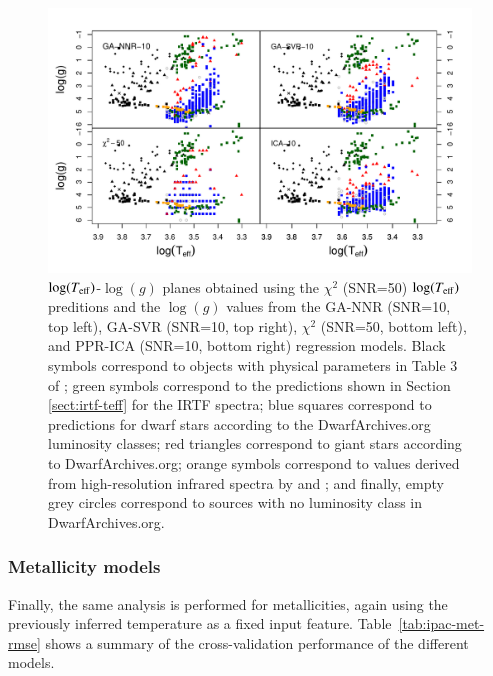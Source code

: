 \begin{figure}
 \begin{center}
 \includegraphics[width=\textwidth]{figs/ipac-teff-logg.pdf}

\caption{$\log(T_{\rm eff})$-$\log(g)$ planes obtained using the $\chi^2$ (SNR=50)
$\log(T_{\rm eff})$ preditions and the $\log(g)$ values from the
GA-NNR (SNR=10, top left), GA-SVR (SNR=10, top right), $\chi^2$
(SNR=50, bottom left), and PPR-ICA (SNR=10, bottom right) regression
models. Black symbols correspond to objects with physical parameters
in Table 3 of \protect\cite{cesetti}; green symbols correspond to the
predictions shown in Section \ref{sect:irtf-teff} for the IRTF
spectra; blue squares correspond to predictions for dwarf stars
according to the DwarfArchives.org luminosity classes; red triangles
correspond to giant stars according to DwarfArchives.org; orange
symbols correspond to values derived from high-resolution infrared
spectra by \protect\cite{esm1} and \protect\cite{esm2}; and finally,
empty grey circles correspond to sources with no luminosity class in
DwarfArchives.org.}

\label{fig:teffvsloggIPAC}
 \end{center}
\end{figure}

\subsubsection{Metallicity models} 

Finally, the same analysis is performed for metallicities, again using
the previously inferred temperature as a fixed input feature.
Table~\ref{tab:ipac-met-rmse} shows a summary of the cross-validation
performance of the different models.

